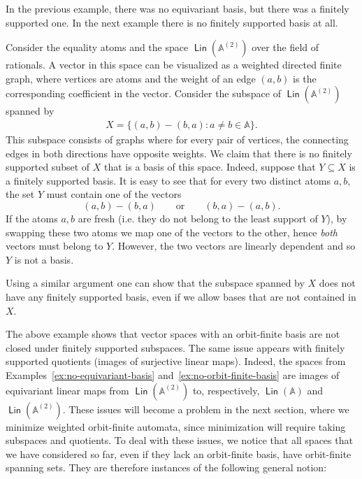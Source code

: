 \documentclass[10pt,a4paper]{amsart}
\numberwithin{equation}{section}
\newcommand{\set}[1]{\{#1\}}
\newcommand{\atoms}{\mathbb A}
\DeclareMathOperator{\lin}{\mathsf{Lin}}
\begin{document}
In the previous example, there was no equivariant basis, but there was a finitely supported one. In the next example there is no finitely supported basis at all.
\begin{example}
    \label{ex:no-orbit-finite-basis}
    Consider the equality atoms and the space  $\lin(\atoms^{(2)})$ over the field of rationals. A vector  in this space can be visualized as a weighted directed finite graph, where 
vertices are atoms and the weight of an edge $(a,b)$ is the corresponding coefficient in the vector. 
Consider the subspace of $\lin(\atoms^{(2)})$  spanned by 
    \begin{align*}
    X = \set{(a,b) - (b,a) : a \neq b \in \atoms}.
    \end{align*}
This subspace consists of graphs where for every pair of vertices, the connecting edges in both directions have opposite weights. We claim that there is no finitely supported subset of $X$ that is a basis of this space. Indeed, suppose that $Y \subseteq X$ is a finitely supported basis. It is easy to see that for every two distinct atoms $a, b$, the set $Y$ must contain one of the  vectors
\[
	(a,b)-(b,a) \qquad \text{or} \qquad (b,a)-(a,b).
\]
If the atoms $a,b$ are fresh (i.e. they do not belong to the least support of $Y$), by swapping these two atoms we map one of the vectors to the other, hence {\em both} vectors must belong to $Y$. However, the two vectors are linearly dependent and so $Y$ is not a basis. 

Using a similar argument one can show that the subspace spanned by $X$ does not have any finitely supported basis, even if we allow bases that are not contained in $X$.
\end{example}

The above example shows that vector spaces with an orbit-finite basis are not closed under finitely supported subspaces.  The same issue appears with finitely supported quotients (images of surjective  linear maps). Indeed, the spaces from Examples~\ref{ex:no-equivariant-basis} and~\ref{ex:no-orbit-finite-basis} are images of equivariant linear maps from $\lin(\atoms^{(2)})$ to, respectively, $\lin(\atoms)$ and $\lin(\atoms^{(2)})$. These issues will become a problem in the next section, where we minimize weighted orbit-finite automata, since minimization will require taking subspaces and quotients.   
To deal with these issues, we notice that all spaces that we have considered so far, even if they lack an orbit-finite basis, have orbit-finite spanning sets. They are therefore instances of the following general notion: 
\end{document}
